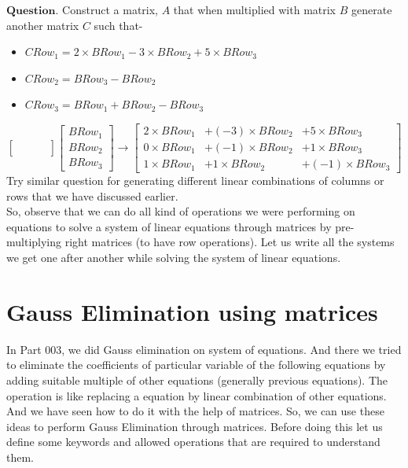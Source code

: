 \documentclass{article}
\begin{document}
$\boldsymbol{Question}$. Construct a matrix, $A$ that when multiplied with matrix $B$ generate another matrix $C$ such that-
\begin{itemize}
    \item $CRow_1 = 2\times BRow_1 - 3\times BRow_2 + 5\times BRow_3$
    \item $CRow_2 =  BRow_3 - BRow_2$
    \item $CRow_3 = BRow_1 + BRow_2 - BRow_3$
\end{itemize}
\[
    \begin{bmatrix}
        & & & \\
        & & & \\
        & & &
    \end{bmatrix} \begin{bmatrix}
                        BRow_1\\
                        BRow_2\\
                        BRow_3
                  \end{bmatrix} \longrightarrow \begin{bmatrix}
                                    2\times BRow_1 &+ (-3)\times BRow_2 &+ 5\times BRow_3 \\
                                    0\times BRow_1 &+ (-1)\times BRow_2 &+ 1\times BRow_3\\
                                    
                                    1\times BRow_1 &+ 1\times BRow_2 &+(-1)\times  BRow_3
                                \end{bmatrix}
\]
Try similar question for generating different linear combinations of columns or rows that we have discussed earlier.\\
So, observe that we can do all kind of operations we were performing on equations to solve a system of linear equations through matrices by pre-multiplying right matrices (to have row operations). Let us write all the systems we get one after another while solving the system of linear equations.\\

\section{Gauss Elimination using matrices}

In Part 003, we did Gauss elimination on system of equations. And there we tried to eliminate the coefficients of particular variable of the following equations by adding suitable multiple of other equations (generally previous equations). The operation is like replacing a equation by linear combination of other equations. And we have seen how to do it with the help of matrices. So, we can use these ideas to perform Gauss Elimination through matrices. Before doing this let us define some keywords and allowed operations that are required to understand them.\\
\end{document}
